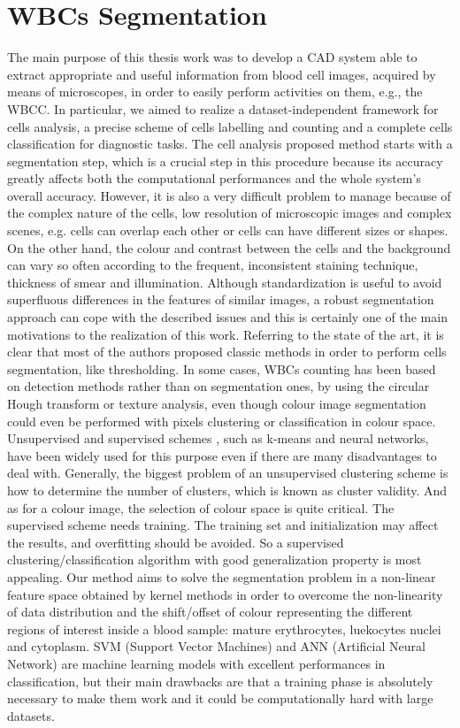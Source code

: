 \documentclass[final,a4paper,12pt,english]{UnicaPhdThesis3}
\begin{document}
	\chapter{WBCs Segmentation}
	The main purpose of this thesis work was to develop a CAD system able to extract appropriate and useful information from blood cell images, acquired by means of microscopes, in order to easily perform activities on them, e.g., the WBCC. In particular, we aimed to realize a dataset-independent framework for cells analysis, a precise scheme of cells labelling and counting and a complete cells classification for diagnostic tasks.
	The cell analysis proposed method starts with a segmentation step, which is a crucial step in this procedure because its accuracy greatly affects both the computational performances and the whole system's overall accuracy. However, it is also a very difficult problem to manage because of the complex nature of the cells, low resolution of microscopic images and complex scenes, e.g. cells can overlap each other or cells can have different sizes or shapes. On the other hand, the colour and contrast between the cells and the background can vary so often according to the frequent, inconsistent staining technique, thickness of smear and illumination. Although standardization is useful to avoid superfluous differences in the features of similar images, a robust segmentation approach can cope with the described issues and this is certainly one of the main motivations to the realization of this work.
	Referring to the state of the art, it is clear that most of the authors proposed classic methods in order to perform cells segmentation, like thresholding. In some cases, WBCs counting has been based on detection methods rather than on segmentation ones, by using the circular Hough transform \cite{Mahmood} or texture analysis, even though colour image segmentation could even be performed with pixels clustering or classification in colour space. Unsupervised and supervised schemes \cite{Pan}, such as k-means and neural networks, have been widely used for this purpose even if there are many disadvantages to deal with. Generally, the biggest problem of an unsupervised clustering scheme is how to determine the number of clusters, which is known as cluster validity. And as for a colour image, the selection of colour space is quite critical. The supervised scheme needs training. The training set and initialization may affect the results, and overfitting should be avoided. So a supervised clustering/classification algorithm with good generalization property is most appealing. Our method aims to solve the segmentation problem in a non-linear feature space obtained by kernel methods in order to overcome the non-linearity of data distribution and the shift/offset of colour representing the different regions of interest inside a blood sample: mature erythrocytes, luekocytes nuclei and cytoplasm. SVM (Support Vector Machines) and ANN (Artificial Neural Network) are machine learning models with excellent performances in classification, but their main drawbacks are that a training phase is absolutely necessary to make them work and it could be computationally hard with large datasets.
\end{document}
